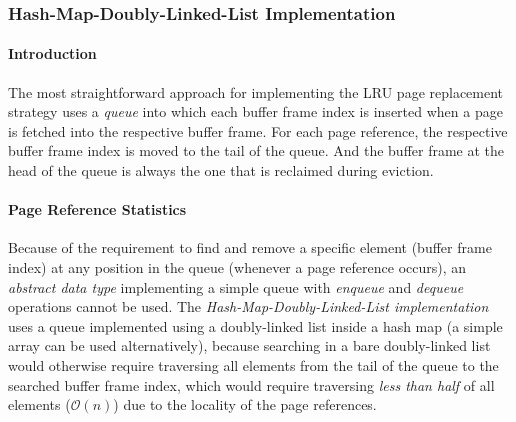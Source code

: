 \subsubsection[Hash-Map-Doubly-Linked-List]{Hash-Map-Doubly-Linked-List Implementation} \label{subsubsec:lru_traditional}

\paragraph{Introduction}

    The most straightforward approach for implementing the LRU page replacement strategy uses a \emph{queue} into which each buffer frame index is inserted when a page is fetched into the respective buffer frame. For each page reference, the respective buffer frame index is moved to the tail of the queue. And the buffer frame at the head of the queue is always the one that is reclaimed during eviction.

\paragraph{Page Reference Statistics}

    Because of the requirement to find and remove a specific element (buffer frame index) at any position in the queue (whenever a page reference occurs), an \emph{abstract data type} implementing a simple queue with \emph{enqueue} and \emph{dequeue} operations cannot be used. The \emph{Hash-Map-Doubly-Linked-List implementation} uses a queue implemented using a doubly-linked list inside a hash map (a simple array can be used alternatively), because searching in a bare doubly-linked list would otherwise require traversing all elements from the tail of the queue to the searched buffer frame index, which would require traversing \emph{less than half} of all elements ($\mathcal{O}\left(n\right)$) due to the locality of the page references.

